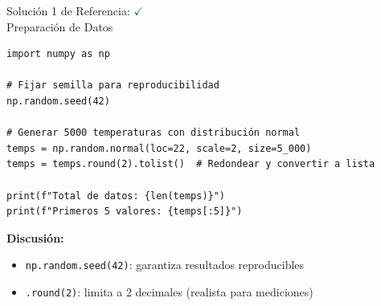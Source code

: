 \documentclass[10pt]{beamer}
\begin{document}
\begin{solutionblock}
\begin{frame}[fragile]{Solución 1 de Referencia: \hfill \textcolor{green}{$\checkmark$} \\ Preparación de Datos}
\begin{verbatim}
import numpy as np

# Fijar semilla para reproducibilidad
np.random.seed(42)

# Generar 5000 temperaturas con distribución normal
temps = np.random.normal(loc=22, scale=2, size=5_000)
temps = temps.round(2).tolist()  # Redondear y convertir a lista

print(f"Total de datos: {len(temps)}")
print(f"Primeros 5 valores: {temps[:5]}")
\end{verbatim}

\textbf{Discusión:} 
\begin{itemize}
  \item \texttt{np.random.seed(42)}: garantiza resultados reproducibles
  \item \texttt{.round(2)}: limita a 2 decimales (realista para mediciones)
\end{itemize}
\end{frame}
\end{solutionblock}
\end{document}
